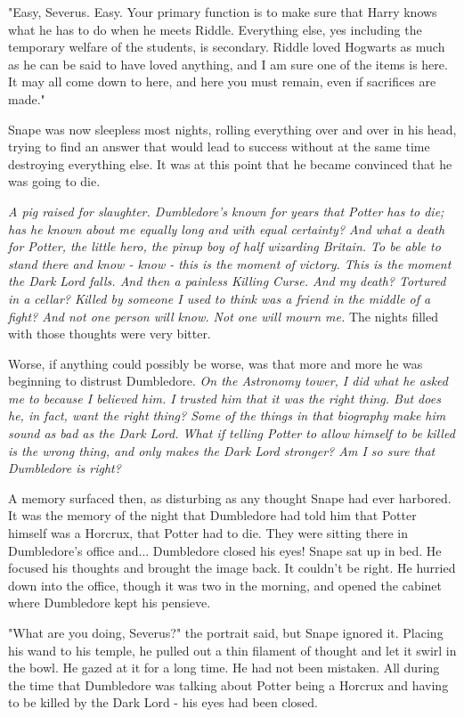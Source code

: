 "Easy, Severus. Easy. Your primary function is to make sure that Harry knows what he has to do when he meets Riddle. Everything else, yes including the temporary welfare of the students, is secondary. Riddle loved Hogwarts as much as he can be said to have loved anything, and I am sure one of the items is here. It may all come down to here, and here you must remain, even if sacrifices are made."

Snape was now sleepless most nights, rolling everything over and over in his head, trying to find an answer that would lead to success without at the same time destroying everything else. It was at this point that he became convinced that he was going to die.

\emph{A pig raised for slaughter. Dumbledore's known for years that Potter has to die; has he known about me equally long and with equal certainty? And what a death for Potter, the little hero, the pinup boy of half wizarding Britain. To be able to stand there and know - know - this is the moment of victory. This is the moment the Dark Lord falls. And then a painless Killing Curse. And my death? Tortured in a cellar? Killed by someone I used to think was a friend in the middle of a fight? And not one person will know. Not one will mourn me.} The nights filled with those thoughts were very bitter.

Worse, if anything could possibly be worse, was that more and more he was beginning to distrust Dumbledore. \emph{On the Astronomy tower, I did what he asked me to because I believed him. I trusted him that it was the right thing. But does he, in fact, want the right thing? Some of the things in that biography make him sound as bad as the Dark Lord. What if telling Potter to allow himself to be killed is the wrong thing, and only makes the Dark Lord stronger? Am I so sure that Dumbledore is right?}

A memory surfaced then, as disturbing as any thought Snape had ever harbored. It was the memory of the night that Dumbledore had told him that Potter himself was a Horcrux, that Potter had to die. They were sitting there in Dumbledore's office and... Dumbledore closed his eyes! Snape sat up in bed. He focused his thoughts and brought the image back. It couldn't be right. He hurried down into the office, though it was two in the morning, and opened the cabinet where Dumbledore kept his pensieve.

"What are you doing, Severus?" the portrait said, but Snape ignored it. Placing his wand to his temple, he pulled out a thin filament of thought and let it swirl in the bowl. He gazed at it for a long time. He had not been mistaken. All during the time that Dumbledore was talking about Potter being a Horcrux and having to be killed by the Dark Lord - his eyes had been closed.

